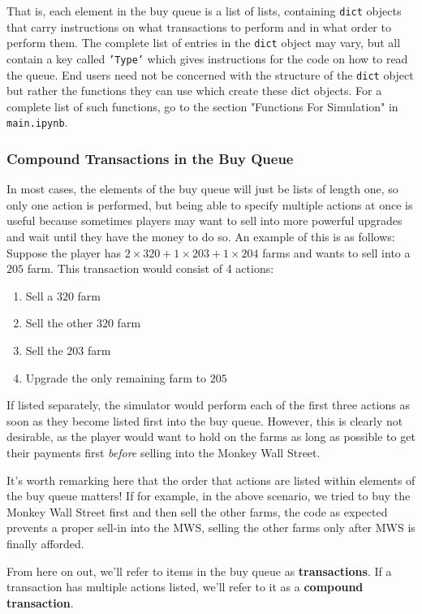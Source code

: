 \documentclass[12pt,letterpaper]{article}
\theoremstyle{remark}
\theoremstyle{plain}
\begin{document}
That is, each element in the buy queue is a list of lists, containing \texttt{dict} objects that carry instructions on what transactions to perform and in what order to perform them. The complete list of entries in the \texttt{dict} object may vary, but all contain a key called \texttt{'Type'} which gives instructions for the code on how to read the queue. End users need not be concerned with the structure of the \texttt{dict} object but rather the functions they can use which create these dict objects. For a complete list of such functions, go to the section "Functions For Simulation" in \texttt{main.ipynb}. 

\subsubsection{Compound Transactions in the Buy Queue}

In most cases, the elements of the buy queue will just be lists of length one, so only one action is performed, but being able to specify multiple actions at once is useful because sometimes players may want to sell into more powerful upgrades and wait until they have the money to do so. An example of this is as follows: Suppose the player has $2 \times 320 + 1 \times 203 + 1 \times 204$ farms and wants to sell into a $205$ farm. This transaction would consist of 4 actions:
\begin{enumerate}
	\item Sell a $320$ farm
	\item Sell the other $320$ farm
	\item Sell the $203$ farm
	\item Upgrade the only remaining farm to $205$
\end{enumerate}
If listed separately, the simulator would perform each of the first three actions as soon as they become listed first into the buy queue. However, this is clearly not desirable, as the player would want to hold on the farms as long as possible to get their payments first \textit{before} selling into the Monkey Wall Street. 

It's worth remarking here that the order that actions are listed within elements of the buy queue matters! If for example, in the above scenario, we tried to buy the Monkey Wall Street first and then sell the other farms, the code as expected prevents a proper sell-in into the MWS, selling the other farms only after MWS is finally afforded.

From here on out, we'll refer to items in the buy queue as \textbf{transactions}. If a transaction has multiple actions listed, we'll refer to it as a \textbf{compound transaction}.
\end{document}

